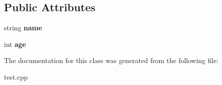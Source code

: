 \subsection*{Public Attributes}
\begin{DoxyCompactItemize}
\item 
\hypertarget{class_animal_a9cf3bfd9070daec7b3bbc87cbd958f35}{string {\bfseries name}}\label{class_animal_a9cf3bfd9070daec7b3bbc87cbd958f35}

\item 
\hypertarget{class_animal_a31e4a23bef9596927496de4eb6b9c721}{int {\bfseries age}}\label{class_animal_a31e4a23bef9596927496de4eb6b9c721}

\end{DoxyCompactItemize}


The documentation for this class was generated from the following file\-:\begin{DoxyCompactItemize}
\item 
test.\-cpp\end{DoxyCompactItemize}
